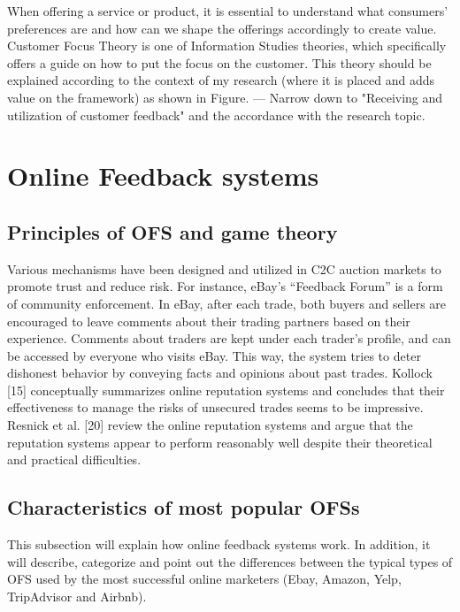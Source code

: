 \documentclass[a4paper, 11pt]{article}
\begin{document}
When offering a service or product, it is essential to understand what consumers' preferences are and how can we shape the offerings accordingly to create value. Customer Focus Theory is one of Information Studies theories, which specifically offers a guide on how to put the focus on the customer. This theory should be explained according to the context of my research (where it is placed and adds value on the framework) as shown in Figure. 
--- Narrow down to "Receiving and utilization of customer feedback" and the accordance with the research topic.


\section{Online Feedback systems}


\subsection{Principles of OFS and game theory}

Various mechanisms have been designed and utilized
in C2C auction markets to promote trust and reduce risk.
For instance,
eBay's “Feedback Forum” is a form of community enforcement.
In eBay, after each trade, both buyers and
sellers are encouraged to leave comments about their
trading partners based on their experience. Comments
about traders are kept under each trader's profile, and can
be accessed by everyone who visits eBay. This way, the
system tries to deter dishonest behavior by conveying
facts and opinions about past trades. Kollock [15]
conceptually summarizes online reputation systems and
concludes that their effectiveness to manage the risks of
unsecured trades seems to be impressive. Resnick et al.
[20] review the online reputation systems and argue that
the reputation systems appear to perform reasonably well
despite their theoretical and practical difficulties. \cite{yang2007effects}


\subsection{Characteristics of most popular OFSs}
\label{subsec:popularOFS}

This subsection will explain how online feedback systems work. In addition, it will describe, categorize and point out the differences between the typical types of OFS used by the most successful online marketers (Ebay, Amazon, Yelp, TripAdvisor and Airbnb). 
\end{document}
